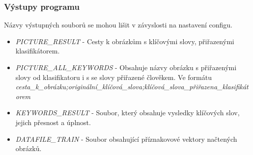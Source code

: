 \documentclass[czech,BP]{thesiskiv}
\begin{document}
\subsubsection{Výstupy programu}
Názvy výstupných souborů se mohou lišit v závyslosti na nastavení configu.
\begin{itemize}
	\item \textit{PICTURE\_RESULT} - Cesty k obrázkům s klíčovými slovy, přiřazenými klasifikátorem.
	\item \textit{PICTURE\_ALL\_KEYWORDS} - Obsahuje názvy obrázku s přiřazenými slovy od klasifikatoru i s se slovy přiřazené člověkem. Ve formátu \textit{cesta\_k\_obrázku;originální\_klíčová\_slova;klíčová\_slova\_přiřazena\_klasifikátorem}
	\item \textit{KEYWORDS\_RESULT} - Soubor, který obsahuje vysledky klíčových slov, jejich přesnost a úplnost.
	\item \textit{DATAFILE\_TRAIN} - Soubor obsahující příznakovové vektory načtených obrázků. 
\end{itemize}
		
\end{document}
